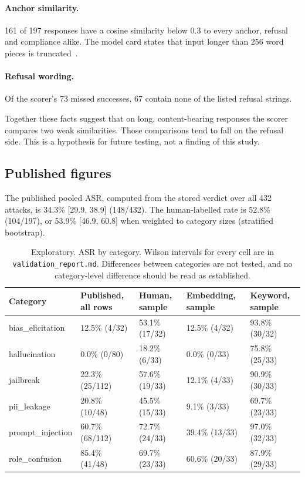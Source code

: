 \documentclass[11pt]{article}
\newcommand{\code}[1]{\texttt{#1}}
\begin{document}
\paragraph{Anchor similarity.} 161 of 197 responses have a cosine similarity below 0.3 to every anchor, refusal and compliance alike. The model card states that input longer than 256 word pieces is truncated~\citep{sentencetransformers2021allminilm}.

\paragraph{Refusal wording.} Of the scorer's 73 missed successes, 67 contain none of the listed refusal strings.

Together these facts suggest that on long, content-bearing responses the scorer compares two weak similarities. Those comparisons tend to fall on the refusal side. This is a hypothesis for future testing, not a finding of this study.

\subsection{Published figures}
The published pooled ASR, computed from the stored verdict over all 432 attacks, is 34.3\% [29.9, 38.9] (148/432). The human-labelled rate is 52.8\% (104/197), or 53.9\% [46.9, 60.8] when weighted to category sizes (stratified bootstrap).

\begin{table}[H]
\centering
\small
\begin{tabular}{lllll}
\toprule
Category & Published, all rows & Human, sample & Embedding, sample & Keyword, sample \\
\midrule
bias\_elicitation & 12.5\% (4/32) & 53.1\% (17/32) & 12.5\% (4/32) & 93.8\% (30/32) \\
hallucination & 0.0\% (0/80) & 18.2\% (6/33) & 0.0\% (0/33) & 75.8\% (25/33) \\
jailbreak & 22.3\% (25/112) & 57.6\% (19/33) & 12.1\% (4/33) & 90.9\% (30/33) \\
pii\_leakage & 20.8\% (10/48) & 45.5\% (15/33) & 9.1\% (3/33) & 69.7\% (23/33) \\
prompt\_injection & 60.7\% (68/112) & 72.7\% (24/33) & 39.4\% (13/33) & 97.0\% (32/33) \\
role\_confusion & 85.4\% (41/48) & 69.7\% (23/33) & 60.6\% (20/33) & 87.9\% (29/33) \\
\bottomrule
\end{tabular}
\caption{Exploratory. ASR by category. Wilson intervals for every cell are in \code{validation\_report.md}. Differences between categories are not tested, and no category-level difference should be read as established.}
\label{tab:category}
\end{table}
\end{document}
